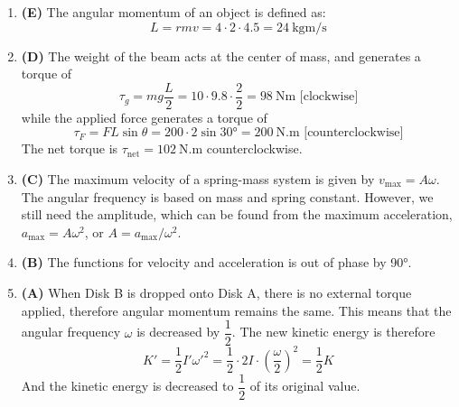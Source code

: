 \documentclass{../../oss-handout}
\begin{document}
\begin{enumerate}[leftmargin=15pt]
\item\textbf{(E)} The angular momentum of an object is defined as:
  \begin{displaymath}
    L=rmv=4\cdot2\cdot 4.5=\boxed{\SI{24}{\kilo\gram\metre\per\second}}
  \end{displaymath}
   
\item\textbf{(D)} The weight of the beam acts at the center of mass, and
  generates a torque of
  \begin{displaymath}
    \tau_g=mg\frac{L}2=10\cdot9.8\cdot\frac22=\SI{98}{\newton\metre}
    \text{ [clockwise]}
  \end{displaymath}
  while the applied force generates a torque of
  \begin{displaymath}
    \tau_F=FL\sin\theta=200\cdot2\sin\ang{30}=\SI{200}{\newton.\metre}
    \text{ [counterclockwise]}
  \end{displaymath}
  The net torque is $\boxed{\tau_\text{net}=\SI{102}{\newton.\metre}}$
  counterclockwise.

\item\textbf{(C)} The maximum velocity of a spring-mass system is given by
  $v_\text{max}=A\omega$. The angular frequency is based on mass and spring
  constant. However, we still need the amplitude, which can be found from the
  maximum acceleration, $a_\text{max}=A\omega^2$, or $A=a_\text{max}/\omega^2$.

\item\textbf{(B)} The functions for velocity and acceleration is out of phase
  by \ang{90}.
  
\item\textbf{(A)} When Disk B is dropped onto Disk A, there is no external
  torque applied, therefore angular momentum remains the same. This means that
  the angular frequency $\omega$ is decreased by $\dfrac12$. The new kinetic
  energy is therefore
  \begin{displaymath}
    K'=\frac12I'\omega'^2=\frac12\cdot2I\cdot\left(\frac{\omega}2\right)^2
    =\frac12K
  \end{displaymath}
  And the kinetic energy is decreased to $\dfrac12$ of its original value.
\end{enumerate}
\end{document}
